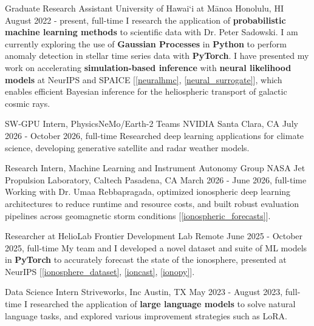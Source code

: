 
\begin{cventries}
\vspace{0mm}

\cventry
{Graduate Research Assistant}
{University of Hawai`i at Mānoa}
{Honolulu, HI}
{August 2022 - present, full-time}
{
    I research the application of \textbf{probabilistic machine learning methods} to scientific data with Dr. Peter Sadowski. I am currently exploring the use of \textbf{Gaussian Processes} in \textbf{Python} to perform anomaly detection in stellar time series data with \textbf{PyTorch}. I have presented my work on accelerating \textbf{simulation-based inference} with \textbf{neural likelihood models} at NeurIPS and SPAICE [\ref{neuralhmc}, \ref{neural_surrogate}], which enables efficient Bayesian inference for the heliospheric transport of galactic cosmic rays.
}

\vspace{0mm}

\cventry
{SW-GPU Intern, PhysicsNeMo/Earth-2 Teams}
{NVIDIA}
{Santa Clara, CA}
{July 2026 - October 2026, full-time}
{
    Researched deep learning applications for climate science, developing generative satellite and radar weather models.
}

\vspace{0.5mm}

\cventry
{Research Intern, Machine Learning and Instrument Autonomy Group}
{NASA Jet Propulsion Laboratory, Caltech}
{Pasadena, CA}
{March 2026 - June 2026, full-time}
{
    Working with Dr. Umaa Rebbapragada, optimized ionospheric deep learning architectures to reduce runtime and resource costs, and built robust evaluation pipelines across geomagnetic storm conditions [\ref{ionospheric_forecasts}].
}

\vspace{0.5mm}

\cventry
{Researcher at HelioLab}
{Frontier Development Lab}
{Remote}
{June 2025 - October 2025, full-time}
{
    My team and I developed a novel dataset and suite of ML models in \textbf{PyTorch} to accurately forecast the state of the ionosphere, presented at NeurIPS [\ref{ionosphere_dataset}, \ref{ioncast}, \ref{ionopy}].
}

\vspace{0mm}

\cventry
{Data Science Intern}
{Striveworks, Inc}
{Austin, TX}
{May 2023 - August 2023, full-time}
{
    I researched the application of \textbf{large language models} to solve natural language tasks, and explored various improvement strategies such as LoRA.
}


\end{cventries}
